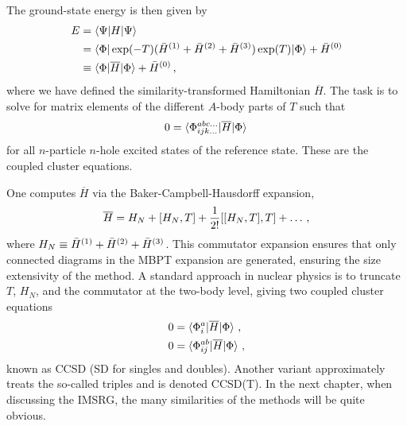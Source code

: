 The ground-state energy is then given by
\begin{align}
  E & = \braket{\Psi | H | \Psi}                                                           \\
    & = \braket{\Phi | \exp(-T) ({\bar{H}}^{(1)} + {\bar{H}}^{(2)} + {\bar{H}}^{(3)}) \exp(T) | \Phi} + {\bar{H}}^{(0)} \\
    & \equiv \braket{\Phi | \overline{H} | \Phi} + {\bar{H}}^{(0)}\,,
\end{align}
where we have defined the similarity-transformed Hamiltonian $\overline{H}$.
The task is to solve for matrix elements of the different $A$-body parts of $T$
such that
\begin{equation}
  0 = \braket{\Phi_{ijk\ldots}^{abc\ldots} | \overline{H} | \Phi}\,
\end{equation}
for all $n$-particle $n$-hole excited states of the reference state.
These are the coupled cluster equations.

One computes $\overline{H}$ via the Baker-Campbell-Hausdorff expansion,
\begin{equation}
  \overline{H} = H_N + [H_N, T] + \frac{1}{2!} [[H_N, T], T] + \ldots \,,
\end{equation}
where $H_N \equiv {\bar{H}}^{(1)} + {\bar{H}}^{(2)} + {\bar{H}}^{(3)}$.
This commutator expansion ensures that only connected diagrams in the MBPT expansion are generated,
ensuring the size extensivity of the method.
A standard approach in nuclear physics is to truncate $T$, $H_N$, and the commutator
at the two-body level,
giving two coupled cluster equations
\begin{align}
  0 & = \braket{\Phi_{i}^{a} | \overline{H} | \Phi}\,,   \\
  0 & = \braket{\Phi_{ij}^{ab} | \overline{H} | \Phi}\,,
\end{align}
known as CCSD (SD for singles and doubles).
Another variant approximately treats the so-called triples and is denoted CCSD(T).\@
In the next chapter, when discussing the IMSRG,
the many similarities of the methods will be quite obvious.
